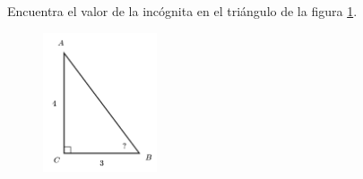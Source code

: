 \question[15]  Encuentra el valor de la incógnita en el triángulo de la figura \ref{fig:angle_functrig_21}.
\begin{figure}[H]
    \begin{center}
        \includegraphics[width=0.3\textwidth]{../images/angle_functrig_21.png}
    \end{center}
    \caption{}
    \label{fig:angle_functrig_21}
\end{figure}